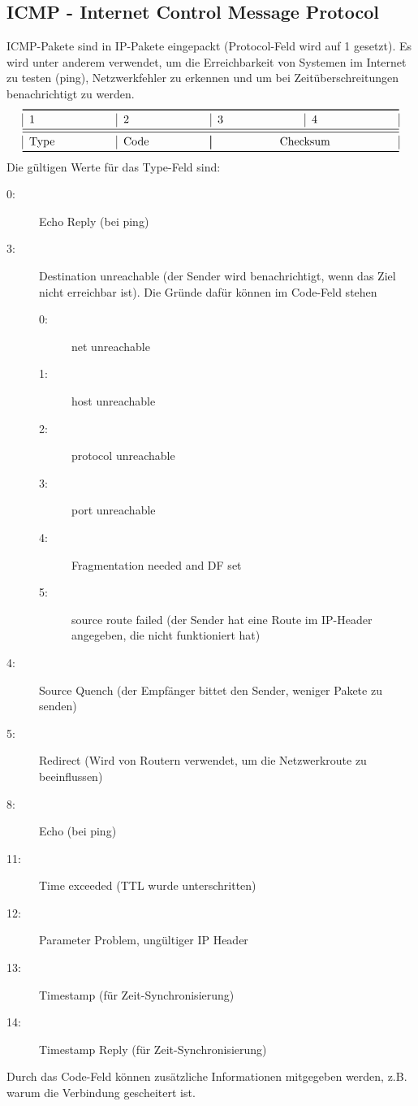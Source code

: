 \documentclass[a4paper,10pt]{scrartcl}
\begin{document}
    \subsection{ICMP - Internet Control Message Protocol}
        ICMP-Pakete sind in IP-Pakete eingepackt (Protocol-Feld wird auf 1 gesetzt). Es wird unter anderem verwendet, um  die Erreichbarkeit von Systemen im Internet zu testen (ping), Netzwerkfehler zu erkennen und um bei Zeitüberschreitungen benachrichtigt zu werden.
        \[
            \begin{tabular}{|p{2.5cm}|p{2.5cm}|p{2.5cm}|p{2.5cm}|}    
                \toprule 
                1 & 2 & 3 & 4  \\
                \midrule\midrule
                Type & Code & \multicolumn{2}{|c|}{Checksum}\\
                \bottomrule
            \end{tabular}
        \]
        Die gültigen Werte für das Type-Feld sind:
        \begin{description}
            \item[0:] Echo Reply (bei ping)
            \item[3:] Destination unreachable (der Sender wird benachrichtigt, wenn das Ziel nicht erreichbar ist). Die Gründe dafür können im Code-Feld stehen
            \begin{description}
            \item[0:] net unreachable
            \item[1:] host unreachable
            \item[2:] protocol unreachable
            \item[3:] port unreachable
            \item[4:] Fragmentation needed and DF set
            \item[5:] source route failed (der Sender hat eine Route im IP-Header angegeben, die nicht funktioniert hat)
            \end{description}
            \item[4:] Source Quench (der Empfänger bittet den Sender, weniger Pakete zu senden)
            \item[5:] Redirect (Wird von Routern verwendet, um die Netzwerkroute zu beeinflussen)
            \item[8:] Echo (bei ping)
            \item[11:] Time exceeded (TTL wurde unterschritten)
            \item[12:] Parameter Problem, ungültiger IP Header
            \item[13:] Timestamp (für Zeit-Synchronisierung)
            \item[14:] Timestamp Reply (für Zeit-Synchronisierung)
        \end{description}
        Durch das Code-Feld können zusätzliche Informationen mitgegeben werden, z.B. warum die Verbindung gescheitert ist.
\end{document}
